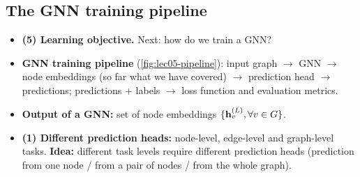 \subsection{The GNN training pipeline}\label{sec:lec05-pipeline}

\begin{itemize}
  \item \textbf{(5) Learning objective.} Next: how do we train a GNN?
  \item \textbf{GNN training pipeline} (\cref{fig:lec05-pipeline}): input graph
    $\to$ GNN $\to$ node embeddings (so far what we have covered) $\to$
    prediction head $\to$ predictions; predictions + labels $\to$ loss function
    and evaluation metrics.
  \item \textbf{Output of a GNN:} set of node embeddings
    $\{\mathbf{h}_v^{(L)},\forall v\in G\}$.
  \item \textbf{(1) Different prediction heads:} node-level, edge-level and
    graph-level tasks. \textbf{Idea:} different task levels require different
    prediction heads (prediction from one node / from a pair of nodes / from
    the whole graph).
\end{itemize}

